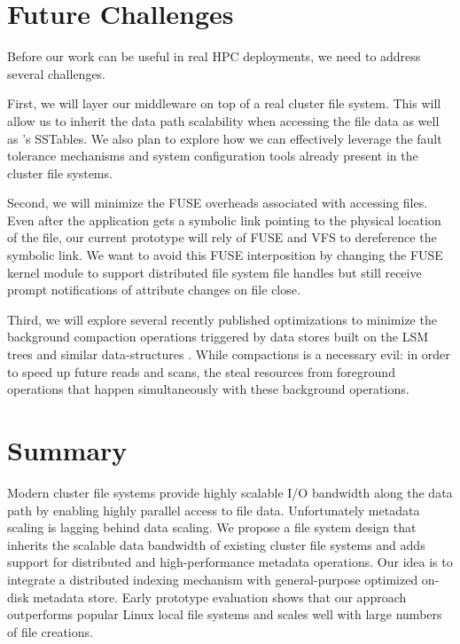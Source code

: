 \section{Future Challenges}
\label{futurework}

Before our work can be useful in real HPC deployments, we need to address
several challenges.

First, we will layer our middleware on top of a real cluster file system.
This will allow us to inherit the data path scalability when accessing the 
file data as well as \ldb's SSTables. We also plan to explore how
we can effectively leverage the fault tolerance mechanisms and system
configuration tools already present in the cluster file systems.

Second, we will minimize the FUSE overheads associated with accessing files.
Even after the application gets a symbolic link pointing to the physical
location of the file, our current prototype will rely of FUSE and VFS to
dereference the symbolic link. We want to avoid this FUSE
interposition by changing the FUSE kernel module to support distributed file
system file handles but still receive prompt notifications of attribute changes
on file close.

Third, we will explore several recently published optimizations to minimize the
background compaction operations triggered by data stores built on the LSM
trees and similar data-structures \cite{blsm, tokufs, Bender2007}. 
While compactions is a necessary evil: in order to speed up future reads and
scans, the steal resources from foreground operations that happen
simultaneously with these background operations.

\section{Summary}
\label{summary}

Modern cluster file systems provide highly scalable I/O bandwidth along the
data path by enabling highly parallel access to file data.
Unfortunately metadata scaling is lagging behind data scaling.
We propose a file system design that 
inherits the scalable data bandwidth of existing cluster file systems
and adds support for distributed and high-performance metadata operations.
Our idea is to integrate a distributed indexing mechanism with general-purpose
optimized on-disk metadata store.
Early prototype evaluation shows that our approach outperforms popular Linux
local file systems and scales well with large numbers of file creations. 




